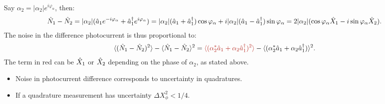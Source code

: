 Say $\alpha_2=|\alpha_2|e^{i\varphi_\alpha}$, then:
{\small
\begin{align*}
    \hat{N}_1-\hat{N}_2=|\alpha_2|(\hat{a}_1e^{-i\varphi_\alpha}+\hat{a}_1^\dagger e^{i\varphi_\alpha})=|\alpha_2|(\hat{a}_1+\hat{a}_1^\dagger)\cos\varphi_\alpha+i|\alpha_2|(\hat{a}_1-\hat{a}_1^\dagger)\sin\varphi_\alpha
    =2|\alpha_2|(\cos\varphi_\alpha\hat{X}_1-i\sin\varphi_\alpha\hat{X}_2).
\end{align*}}
The noise in the difference photocurrent is thus proportional to:
\begin{align*}
    \braket{(\hN_1-\hN_2)^2}-\braket{\hN_1-\hN_2}^2=\textcolor{BrickRed}{\braket{(\alpha_2^*\ha_1+\alpha_2\ha_1^\dagger)^2}}-\braket{(\alpha_2^*\ha_1+\alpha_2\ha_1^\dagger)}^2.
\end{align*}
The term in red can be $\hat{X}_1$ or $\hat{X}_2$ depending on the phase of $\alpha_2$, as stated above.
\begin{itemize}[itemsep=0pt,topsep=0pt,parsep=0pt]
    \item Noise in photocurrent difference corresponds to uncertainty in quadratures.
    \item If a quadrature measurement has uncertainty $\Delta X_\phi^2<1/4$.
\end{itemize}


